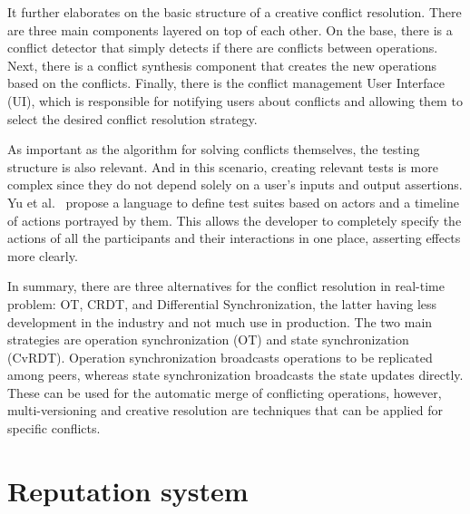 It further elaborates on the basic structure of a creative conflict resolution. There are three main components layered on top of each other. On the base, there is a conflict detector that simply detects if there are conflicts between operations. Next, there is a conflict synthesis component that creates the new operations based on the conflicts. Finally, there is the conflict management User Interface (UI), which is responsible for notifying users about conflicts and allowing them to select the desired conflict resolution strategy.

As important as the algorithm for solving conflicts themselves, the testing structure is also relevant. And in this scenario, creating relevant tests is more complex since they do not depend solely on a user's inputs and output assertions. Yu et al.\ \cite{Yu2007} propose a language to define test suites based on actors and a timeline of actions portrayed by them. This allows the developer to completely specify the actions of all the participants and their interactions in one place, asserting effects more clearly.

In summary, there are three alternatives for the conflict resolution in real-time problem: OT, CRDT, and Differential Synchronization, the latter having less development in the industry and not much use in production. The two main strategies are operation synchronization (OT) and state synchronization (CvRDT). Operation synchronization broadcasts operations to be replicated among peers, whereas state synchronization broadcasts the state updates directly. These can be used for the automatic merge of conflicting operations, however, multi-versioning and creative resolution are techniques that can be applied for specific conflicts.

\section{Reputation system}\label{sec:rep-sys-sota}

